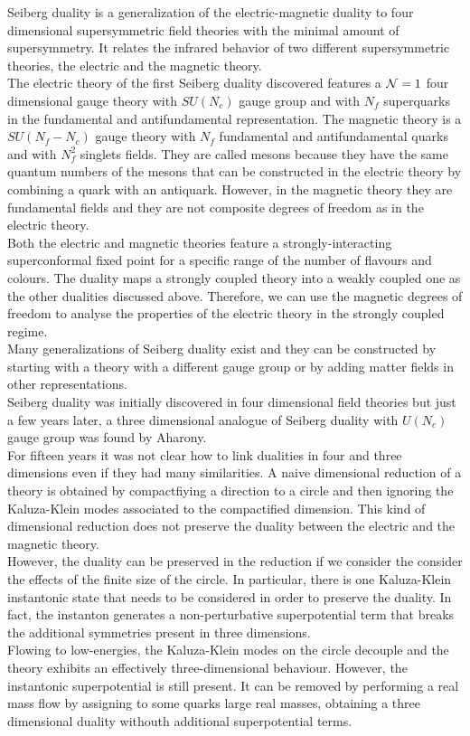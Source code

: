 Seiberg duality is a generalization of the electric-magnetic duality to four dimensional supersymmetric field theories with the minimal amount of supersymmetry.
It relates the infrared behavior of two different supersymmetric theories, the electric and the magnetic theory.\\
The electric theory of the first Seiberg duality discovered features a $\mathcal{N}=1$ four dimensional gauge theory with $SU(N_c)$ gauge group and with $N_f$ superquarks in the fundamental and antifundamental representation.
The magnetic theory is a $SU(N_f-N_c)$ gauge theory with $N_f$ fundamental and antifundamental quarks and with $N_f^2$ singlets fields. 
They are called mesons because they have the same quantum numbers of the mesons that can be constructed in the electric theory by combining a quark with an antiquark. 
However, in the magnetic theory they are fundamental fields and they are not composite degrees of freedom as in the electric theory.\\
Both the electric and magnetic theories feature a strongly-interacting superconformal fixed point for a specific range of the number of flavours and colours. 
The duality maps a strongly coupled theory into a weakly coupled one as the other dualities discussed above. 
Therefore, we can use the magnetic degrees of freedom to analyse the properties of the electric theory in the strongly coupled regime.\\
Many generalizations of Seiberg duality exist and they can be constructed by starting with a theory with a different gauge group or by adding matter fields in other representations.
\\
Seiberg duality was initially discovered in four dimensional field theories but just a few years later, a three dimensional analogue of Seiberg duality with $U(N_c)$ gauge group was found by Aharony.\\

For fifteen years it was not clear how to link dualities in four and three dimensions even if they had many similarities. 
A naive dimensional reduction of a theory is obtained by compactfiying a direction to a circle and then ignoring the Kaluza-Klein modes associated to the compactified dimension.
This kind of dimensional reduction does not preserve the duality between the electric and the magnetic theory.  \\
However, the duality can be preserved in the reduction if we consider the consider the effects of the finite size of the circle.
In particular, there is one Kaluza-Klein instantonic state that needs to be considered in order to preserve the duality.
In fact, the instanton generates a non-perturbative superpotential term that breaks the additional symmetries present in three dimensions.\\
Flowing to low-energies, the Kaluza-Klein modes on the circle decouple and the theory exhibits an effectively three-dimensional behaviour.
However, the instantonic superpotential is still present. 
It can be removed by performing a real mass flow by assigning to some quarks large real masses, obtaining a three dimensional duality withouth additional superpotential terms.

